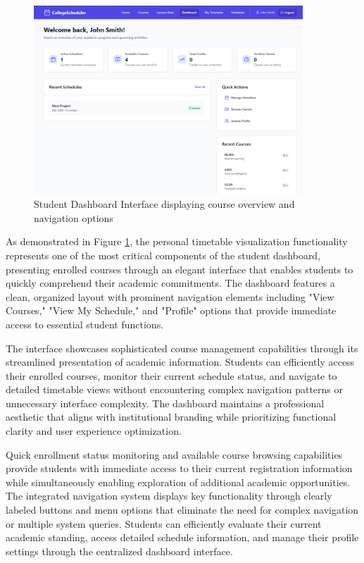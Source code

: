 \begin{figure}[htbp]
    \centering
    \includegraphics[width=0.9\textwidth]{images/Screenshot of Dashboard for Student.png}
    \caption{Student Dashboard Interface displaying course overview and navigation options}
    \label{fig:student_dashboard}
\end{figure}

As demonstrated in Figure \ref{fig:student_dashboard}, the personal timetable visualization functionality represents one of the most critical components of the student dashboard, presenting enrolled courses through an elegant interface that enables students to quickly comprehend their academic commitments. The dashboard features a clean, organized layout with prominent navigation elements including "View Courses," "View My Schedule," and "Profile" options that provide immediate access to essential student functions.

The interface showcases sophisticated course management capabilities through its streamlined presentation of academic information. Students can efficiently access their enrolled courses, monitor their current schedule status, and navigate to detailed timetable views without encountering complex navigation patterns or unnecessary interface complexity. The dashboard maintains a professional aesthetic that aligns with institutional branding while prioritizing functional clarity and user experience optimization.

Quick enrollment status monitoring and available course browsing capabilities provide students with immediate access to their current registration information while simultaneously enabling exploration of additional academic opportunities. The integrated navigation system displays key functionality through clearly labeled buttons and menu options that eliminate the need for complex navigation or multiple system queries. Students can efficiently evaluate their current academic standing, access detailed schedule information, and manage their profile settings through the centralized dashboard interface.

